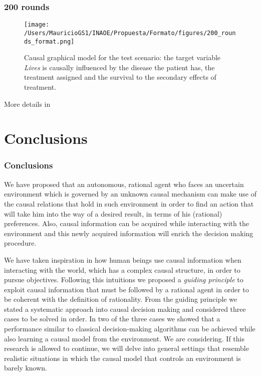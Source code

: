\documentclass{beamer}
\theoremstyle{plain}
\begin{document}
\begin{frame}
\frametitle{200 rounds}
\begin{figure}[ht]
\vskip 0.2in
\begin{center}
\texttt{[image: /Users/MauricioGS1/INAOE/Propuesta/Formato/figures/200\_rounds\_format.png]}
\caption{Causal graphical model for the test scenario: the target variable \textit{Lives} is causally influenced by the disease the patient has, the treatment assigned and the survival to the secondary effects of treatment.}
\label{causal_model}
\end{center}
\vskip -0.2in
\end{figure}
\end{frame}

\begin{frame}
More details in \cite{gonzalez2018playing}
\end{frame}

\section{Conclusions}
\begin{frame}
\frametitle{Conclusions}
We have proposed that an autonomous, rational agent who faces an uncertain environment which is governed by an unknown causal mechanism can make use of the causal relations that hold in such environment in order to find an action that will take him into the way of a desired result, in terms of his (rational) preferences. Also, causal information can be acquired while interacting with the environment and this newly acquired information will enrich the decision making procedure.
\end{frame} 
\begin{frame}
We have taken inspiration in how human beings use causal information when interacting with the world, which has a complex causal structure, in order to pursue objectives. Following this intuitions we proposed a \textit{guiding principle} to exploit causal information that must be followed by a rational agent in order to be coherent with the definition of rationality. From the guiding principle we stated a systematic approach into causal decision making and considered three cases to be solved in order. In two of the three cases we showed that a performance similar to classical decision-making algorithms can be achieved while also learning a causal model from the environment. We are considering. If this research is allowed to continue, we will delve into general settings that resemble realistic situations in which the causal model that controls an environment is barely known.
\end{frame}
\end{document}
